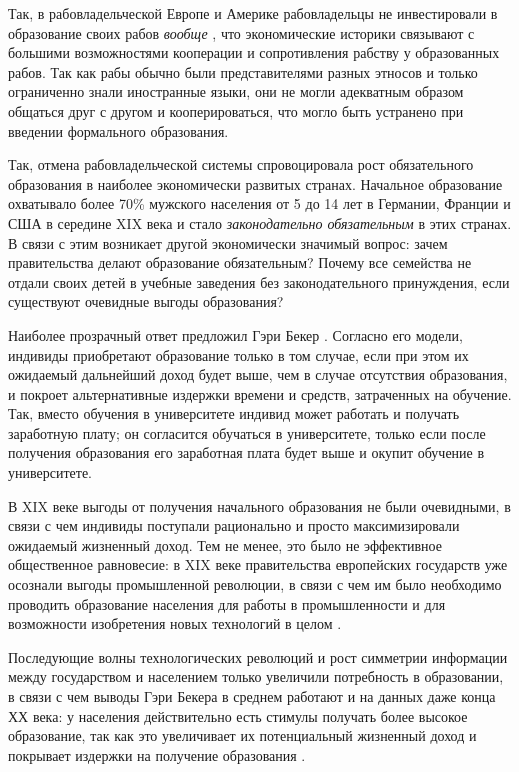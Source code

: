 \documentclass[a4paper]{article}
\begin{document}
Так, в рабовладельческой Европе и Америке рабовладельцы не инвестировали в образование своих рабов \textit{вообще} \cite[Goldin, 2016]{Goldin}, что экономические историки связывают с большими возможностями кооперации и сопротивления рабству у образованных рабов.  Так как рабы обычно были представителями разных этносов и только ограниченно знали иностранные языки, они не могли адекватным образом общаться друг с другом и кооперироваться, что могло быть устранено при введении формального образования. 

Так, отмена рабовладельческой системы спровоцировала рост обязательного образования в наиболее экономически развитых странах. Начальное образование охватывало более 70\% мужского населения от 5 до 14 лет в Германии, Франции и США в середине XIX века \cite[Goldin, 2016]{Goldin} и стало \textit{законодательно обязательным} в этих странах. В связи с этим возникает другой экономически значимый вопрос: зачем правительства делают образование обязательным? Почему все семейства не отдали своих детей в учебные заведения без законодательного принуждения, если существуют очевидные выгоды образования? 

Наиболее прозрачный ответ предложил Гэри Бекер \cite[Becker, 2009]{Beck}. Согласно его модели, индивиды приобретают образование только в том случае, если при этом их ожидаемый дальнейший доход будет выше, чем в случае отсутствия образования, и покроет альтернативные издержки времени и средств, затраченных на обучение. Так, вместо обучения в университете индивид может работать и получать заработную плату; он согласится обучаться в университете, только если после получения образования его заработная плата будет выше и окупит обучение в университете. 

В XIX веке выгоды от получения начального образования не были очевидными, в связи с чем индивиды поступали рационально и просто максимизировали ожидаемый жизненный доход. Тем не менее, это было не эффективное общественное равновесие: в XIX веке правительства европейских государств уже осознали выгоды промышленной революции, в связи с чем им было необходимо проводить образование населения для работы в промышленности и для возможности изобретения новых технологий в целом \cite[Goldin, 2016]{Goldin}. 

Последующие волны технологических революций и рост симметрии информации между государством и населением только увеличили потребность в образовании, в связи с чем выводы Гэри Бекера в среднем работают и на данных даже конца ХХ века: у населения действительно есть стимулы получать более высокое образование, так как это увеличивает их потенциальный жизненный доход и покрывает издержки на получение образования \cite[Becker, 2009]{Beck}. 
\end{document}
